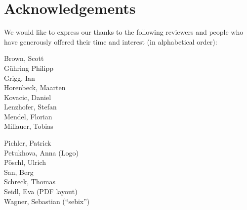 \newpage
\section*{Acknowledgements}
\label{section:Reviewers}


We would like to express our thanks to the following reviewers and people who have generously offered their time and interest (in alphabetical order):


\vline{}

\begin{minipage}[b]{0.5\linewidth}
\center
Brown, Scott \\
G\"uhring Philipp  \\
Grigg, Ian  \\
Horenbeck, Maarten \\
Kovacic, Daniel \\
Lenzhofer, Stefan \\
Mendel, Florian \\
Millauer, Tobias \\
\end{minipage}
\begin{minipage}[b]{0.5\linewidth}
\center
Pichler, Patrick \\
Petukhova, Anna (Logo) \\
P\"oschl, Ulrich \\
San, Berg \\
Schreck, Thomas  \\
Seidl, Eva (PDF layout) \\
Wagner, Sebastian (``sebix'') \\
\end{minipage}




